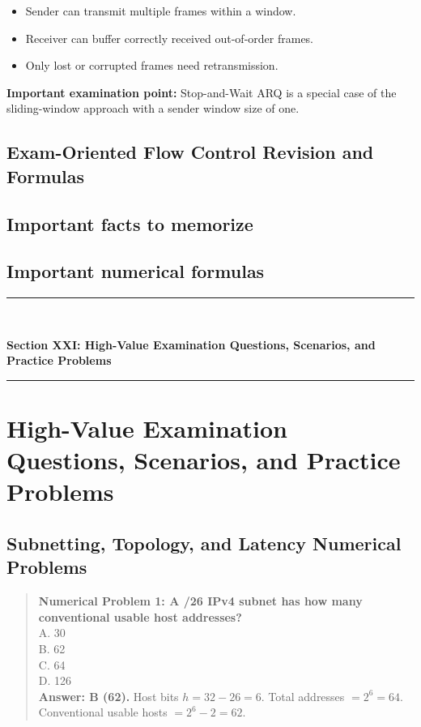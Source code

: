 \begin{itemize}
\item Sender can transmit multiple frames within a window.
\item Receiver can buffer correctly received out-of-order frames.
\item Only lost or corrupted frames need retransmission.
\end{itemize}

\textbf{Important examination point:} Stop-and-Wait ARQ is a special case of the sliding-window approach with a sender window size of one.

\subsection{Exam-Oriented Flow Control Revision and Formulas}

\subsection{Important facts to memorize}


\subsection{Important numerical formulas}



\newpage
\begin{center}
\vspace{0.5em}
{\color{primary}\rule{0.45\textwidth}{1.2pt}\\[4pt]}
{\Large\bfseries\color{primary} Section XXI: High-Value Examination Questions, Scenarios, and Practice Problems\\[2pt]}
{\color{primary}\rule{0.45\textwidth}{1.2pt}}
\vspace{0.5em}
\end{center}

\section{High-Value Examination Questions, Scenarios, and Practice Problems}

\subsection{Subnetting, Topology, and Latency Numerical Problems}

\begin{quote}
\textbf{Numerical Problem 1: A /26 IPv4 subnet has how many conventional usable host addresses?}\\[4pt]
\quad A. 30\\[2pt]
\quad B. 62\\[2pt]
\quad C. 64\\[2pt]
\quad D. 126\\[2pt]
\vspace{4pt}
\textbf{Answer: B (62).} Host bits $h = 32 - 26 = 6$. Total addresses $= 2^6 = 64$. Conventional usable hosts $= 2^6 - 2 = 62$.
\end{quote}

